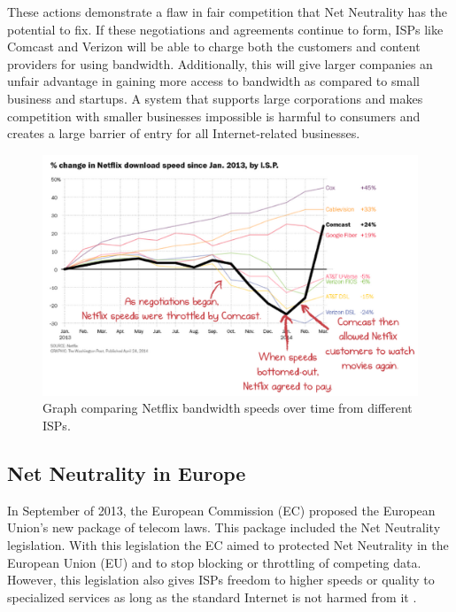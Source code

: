 \documentclass{sigcomm-alternate}
\begin{document}
These actions demonstrate a flaw in fair competition that Net Neutrality has the potential to fix. If these negotiations and agreements continue to form, ISPs like Comcast and Verizon will be able to charge both the customers and content providers for using bandwidth. Additionally, this will give larger companies an unfair advantage in gaining more access to bandwidth as compared to small business and startups. A system that supports large corporations and makes competition with smaller businesses impossible is harmful to consumers and creates a large barrier of entry for all Internet-related businesses.



\begin{figure}
	\label{fig:netflix}
	\hspace*{-0cm}
	\includegraphics[scale=.20]{NetflixGraph.png}
	\caption{Graph comparing Netflix bandwidth speeds over time from different ISPs.}
\end{figure}





\subsection{Net Neutrality in Europe}

In September of 2013, the European Commission (EC) proposed the European Union’s new package of telecom laws. This package included the Net Neutrality legislation. With this legislation the EC aimed to protected Net Neutrality in the European Union (EU) and to stop blocking or throttling of competing data. However, this legislation also gives ISPs freedom to higher speeds or quality to specialized services as long as the standard Internet is not harmed from it \cite{economics}.
\end{document}
